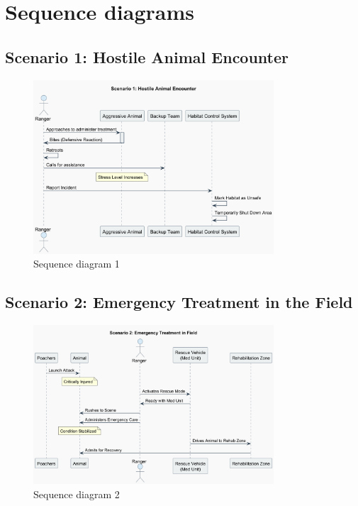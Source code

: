 \documentclass[a4paper,12pt]{article}
\begin{document}
\newpage
\section{\textbf{Sequence diagrams}}
\subsection{Scenario 1: Hostile Animal Encounter}
\begin{figure}[H]
    \centering
    \includegraphics[width=0.8\textwidth]{sequence1.png}
    \caption{Sequence diagram 1}
    \label{fig:sequence-diagram1}
\end{figure}

\subsection{Scenario 2: Emergency Treatment in the Field}
\begin{figure}[H]
    \centering
    \includegraphics[width=0.8\textwidth]{sequence2.png}
    \caption{Sequence diagram 2}
    \label{fig:sequence-diagram2}
\end{figure}
\end{document}
